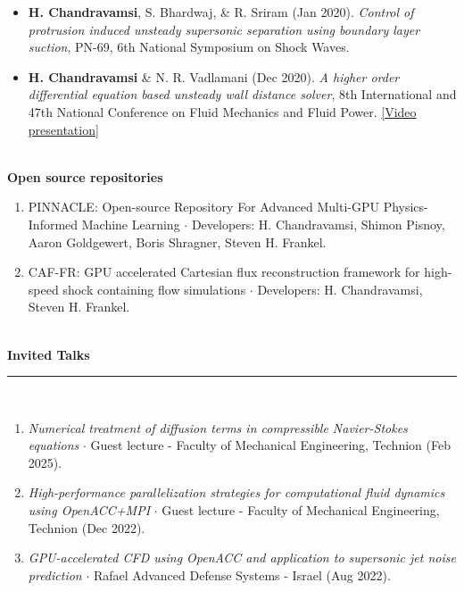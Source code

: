 \begin{itemize}[itemsep=0pt, topsep=0pt, label=]
    \item \textbf{H. Chandravamsi}, S. Bhardwaj, \& R. Sriram (Jan 2020). \textit{Control of protrusion induced unsteady supersonic separation using boundary layer suction}, PN-69, 6th National Symposium on Shock Waves.
\end{itemize}

\begin{itemize}[itemsep=0pt, topsep=0pt, label=]
    \item \textbf{H. Chandravamsi} \& N. R. Vadlamani (Dec 2020). \textit{A higher order differential equation based unsteady wall distance solver}, 8th International and 47th National Conference on Fluid Mechanics and Fluid Power. \href{https://youtu.be/xqgQpyRYbQg}{[Video presentation]}
\end{itemize}


\ \\[0mm]
\noindent \textbf{\textbf{Open source repositories}}
\begin{enumerate}[itemsep=-1mm]
    \item PINNACLE: Open-source Repository For Advanced Multi-GPU Physics-Informed Machine Learning $\cdot$ Developers: H. Chandravamsi, Shimon Pisnoy, Aaron Goldgewert, Boris Shragner, Steven H. Frankel.
    \item CAF-FR: GPU accelerated Cartesian flux reconstruction framework for high-speed shock containing flow simulations $\cdot$ Developers: H. Chandravamsi, Steven H. Frankel.
\end{enumerate}

\ \\[2mm]
\noindent \textbf{\large{Invited Talks}}\\[-2.5mm]
\noindent\rule{\textwidth}{0.4pt} \\[-5mm]
\begin{enumerate}[itemsep=-1mm]
    \item \textit{Numerical treatment of diffusion terms in compressible Navier-Stokes equations} $\cdot$ Guest lecture - Faculty of Mechanical Engineering, Technion (Feb 2025).
    \item \textit{High-performance parallelization strategies for computational fluid dynamics using OpenACC+MPI} $\cdot$ Guest lecture - Faculty of Mechanical Engineering, Technion (Dec 2022).
    \item \textit{GPU-accelerated CFD using OpenACC and application to supersonic jet noise prediction} $\cdot$ Rafael Advanced Defense Systems - Israel (Aug 2022).
\end{enumerate}

